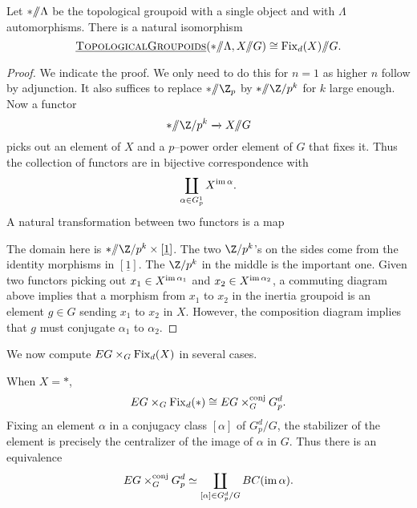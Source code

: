 \begin{lemma} \label{inertialemma}
Let $\ast /\!\!/ \Lambda$ be the topological groupoid with a single object and with $\Lambda$ automorphisms. There is a natural isomorphism 
\[
\operatorname{\underline{\smash{\normalfont\textsc{TopologicalGroupoids}}}}(\ast /\!\!/ \Lambda, X /\!\!/ G) \cong \operatorname{Fix}_d(X) /\!\!/ G.
\]
\end{lemma} 
\begin{proof}
We indicate the proof. We only need to do this for $n=1$ as higher $n$ follow by adjunction. It also suffices to replace $\ast \mmod \Z_p$ by $\ast \mmod \Z/p^k$ for $k$ large enough. Now a functor
\[
\ast \mmod \Z/p^k \xrightarrow{} X \mmod G
\]
picks out an element of $X$ and a $p$--power order element of $G$ that fixes it. Thus the collection of functors are in bijective correspondence with
\[
\coprod_{\alpha \in G^{1}_{p}} X^{\operatorname{im} \alpha}.
\]
A natural transformation between two functors is a map
\begin{center}
\end{center}
The domain here is $\ast \mmod \Z/p^k \times [\underline{1}]$. The two $\Z/p^k$'s on the sides come from the identity morphisms in $[\underline{1}]$. The $\Z/p^k$ in the middle is the important one. Given two functors picking out $x_1 \in X^{\operatorname{im} \alpha_1}$ and $x_2 \in X^{\operatorname{im} \alpha_2}$, a commuting diagram above implies that a morphism from $x_1$ to $x_2$ in the inertia groupoid is an element $g \in G$ sending $x_1$ to $x_2$ in $X$. However, the composition diagram implies that $g$ must conjugate $\alpha_1$ to $\alpha_2$.
\end{proof}

We now compute $EG \times_G \operatorname{Fix}_d(X)$ in several cases.

\begin{example} \label{xapoint2}
When $X = \ast$,
\[
EG \times_G \operatorname{Fix}_d(\ast) \cong EG \times_{G}^{\text{conj}} G_{p}^{d}.
\]
Fixing an element $\alpha$ in a conjugacy class $[\alpha]$ of $G_{p}^{d}/G$, the stabilizer of the element is precisely the centralizer of the image of $\alpha$ in $G$. Thus there is an equivalence
\[
EG \times_{G}^{\text{conj}} G_{p}^{d} \simeq \coprod_{[\alpha] \in G_{p}^{d}/G} BC(\operatorname{im} \alpha).
\]
\end{example}

